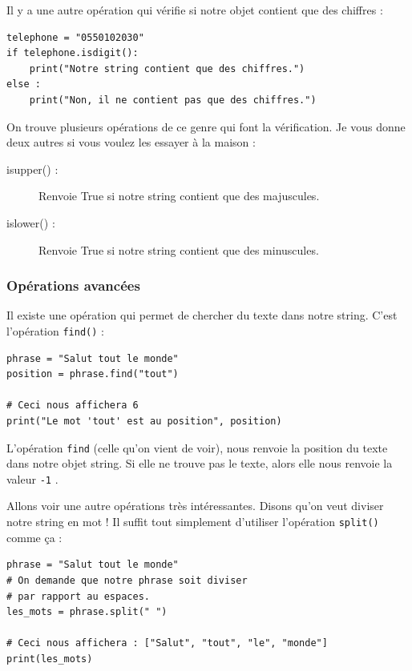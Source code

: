 \documentclass[12pt]{article}
\newcommand{\code}[1]{\colorbox{light-gray}{\texttt{#1}}}
\begin{document}
            Il y a une autre opération qui vérifie si notre objet contient que des chiffres :
            \begin{lstlisting}[style=code]
telephone = "0550102030"
if telephone.isdigit():
    print("Notre string contient que des chiffres.")
else :
    print("Non, il ne contient pas que des chiffres.")
            \end{lstlisting}

            On trouve plusieurs opérations de ce genre qui font la vérification.
            Je vous donne deux autres si vous voulez les essayer à la maison :
            \begin{description}
                \item[isupper() :] Renvoie True si notre string contient que des majuscules.
                \item[islower() :] Renvoie True si notre string contient que des minuscules.
            \end{description}

        \subsubsection{Opérations avancées}
            Il existe une opération qui permet de chercher du texte dans notre string. C'est l'opération \code{find()} :
            \begin{lstlisting}[style=code]
phrase = "Salut tout le monde"
position = phrase.find("tout")

# Ceci nous affichera 6
print("Le mot 'tout' est au position", position)
            \end{lstlisting}

            L'opération \code{find} (celle qu'on vient de voir), nous renvoie la position du texte dans notre
            objet string. Si elle ne trouve pas le texte, alors elle nous renvoie la valeur \code{-1} .

            Allons voir une autre opérations très intéressantes. Disons qu'on veut diviser notre string en mot !
            Il suffit tout simplement d'utiliser l'opération \code{split()} comme ça :

            \begin{lstlisting}[style=code]
phrase = "Salut tout le monde"
# On demande que notre phrase soit diviser
# par rapport au espaces.
les_mots = phrase.split(" ")

# Ceci nous affichera : ["Salut", "tout", "le", "monde"]
print(les_mots)
            \end{lstlisting}
\end{document}
